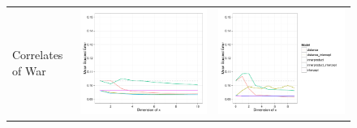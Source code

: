 \begin{figure}
\begin{tabular}{m{2cm}cc}
  \tiny{Correlates of War} & \includegraphics[height=0.2\textheight]{chapter_foreign_relations/figures/008_static_model_results.pdf} & \includegraphics[height=0.2\textheight]{chapter_foreign_relations/figures/009_dynamic_model_results.pdf} \\

\end{tabular}
\end{figure}
